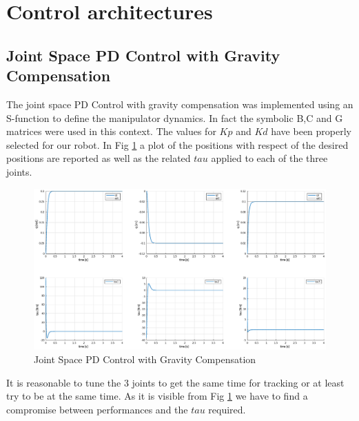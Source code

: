 \documentclass[a4paper,12pt]{article}
\begin{document}
\newpage 
\section{Control architectures}
\subsection{Joint Space PD Control with Gravity Compensation}

The joint space PD Control with gravity compensation was implemented using an S-function to define the manipulator dynamics. In fact the symbolic B,C and G matrices were used in this context. The values for $Kp$ and $Kd$ have been properly selected for our robot. In Fig \ref{fig:gravity_comp} a plot of the positions with respect of the desired positions are reported as well as the related $tau$ applied to each of the three joints.
\begin{figure}[H]
    \begin{center}
        \hspace*{-4.5cm}
        \includegraphics[scale=0.5]{images/gravity_comp.eps}
    \end{center}
    \caption{Joint Space PD Control with Gravity Compensation}
    \label{fig:gravity_comp}
\end{figure}

It is reasonable to tune the 3 joints to get the same time for tracking or at least try to be at the same time. As it is visible from Fig \ref{fig:gravity_comp} we have to find a compromise between performances and the $tau$ required.

\newpage
\end{document}

